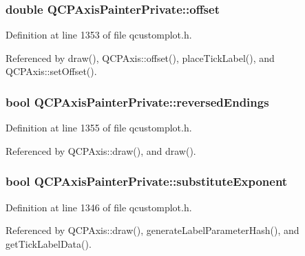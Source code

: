 \subsubsection[{offset}]{\setlength{\rightskip}{0pt plus 5cm}double Q\+C\+P\+Axis\+Painter\+Private\+::offset}\label{class_q_c_p_axis_painter_private_aea226a1e39357d71f66d85093e30a830}


Definition at line 1353 of file qcustomplot.\+h.



Referenced by draw(), Q\+C\+P\+Axis\+::offset(), place\+Tick\+Label(), and Q\+C\+P\+Axis\+::set\+Offset().

\hypertarget{class_q_c_p_axis_painter_private_a06d0ef3f4f1b567feb84196fc3b140da}{}
\subsubsection[{reversed\+Endings}]{\setlength{\rightskip}{0pt plus 5cm}bool Q\+C\+P\+Axis\+Painter\+Private\+::reversed\+Endings}\label{class_q_c_p_axis_painter_private_a06d0ef3f4f1b567feb84196fc3b140da}


Definition at line 1355 of file qcustomplot.\+h.



Referenced by Q\+C\+P\+Axis\+::draw(), and draw().

\hypertarget{class_q_c_p_axis_painter_private_a546d22b10ddb5ca8582b7deb90223a91}{}
\subsubsection[{substitute\+Exponent}]{\setlength{\rightskip}{0pt plus 5cm}bool Q\+C\+P\+Axis\+Painter\+Private\+::substitute\+Exponent}\label{class_q_c_p_axis_painter_private_a546d22b10ddb5ca8582b7deb90223a91}


Definition at line 1346 of file qcustomplot.\+h.



Referenced by Q\+C\+P\+Axis\+::draw(), generate\+Label\+Parameter\+Hash(), and get\+Tick\+Label\+Data().

